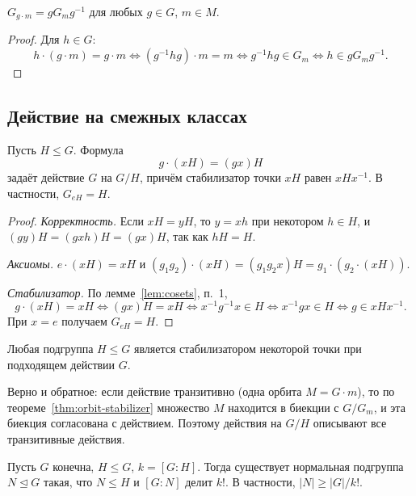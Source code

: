 \documentclass[12pt]{article}
\begin{document}
	\begin{statement}\label{st:conjugate-stabilizers}
		$G_{g \cdot m} = gG_mg^{-1}$ для любых $g \in G$, $m \in M$.
	\end{statement}

	\begin{proof}
		Для $h \in G$:
		\[
			h \cdot (g \cdot m) = g \cdot m \iff (g^{-1}hg) \cdot m = m \iff g^{-1}hg \in G_m \iff h \in gG_mg^{-1}.
		\]
	\end{proof}

	\subsection{Действие на смежных классах}

	\begin{theorem}\label{thm:action-on-cosets}
		Пусть $H \leqslant G$. Формула
		\[
			g \cdot (xH) = (gx)H
		\]
		задаёт действие $G$ на $G/H$, причём стабилизатор точки $xH$ равен $xHx^{-1}$. В частности, $G_{eH} = H$.
	\end{theorem}

	\begin{proof}
		\emph{Корректность.} Если $xH = yH$, то $y = xh$ при некотором $h \in H$, и $(gy)H = (gxh)H = (gx)H$, так как $hH = H$.

		\emph{Аксиомы.} $e \cdot (xH) = xH$ и $(g_1g_2) \cdot (xH) = (g_1g_2x)H = g_1 \cdot (g_2 \cdot (xH))$.

		\emph{Стабилизатор.} По лемме~\ref{lem:cosets}, п.~1,
		\[
			g \cdot (xH) = xH \iff (gx)H = xH \iff x^{-1}g^{-1}x \in H \iff x^{-1}gx \in H \iff g \in xHx^{-1}.
		\]
		При $x = e$ получаем $G_{eH} = H$.
	\end{proof}

	\begin{corollary}\label{cor:any-subgroup-stabilizer}
		Любая подгруппа $H \leqslant G$ является стабилизатором некоторой точки при подходящем действии $G$.
	\end{corollary}

	\begin{note}
		Верно и обратное: если действие транзитивно (одна орбита $M = G \cdot m$), то по теореме~\ref{thm:orbit-stabilizer} множество $M$ находится в биекции с $G/G_m$, и эта биекция согласована с действием. Поэтому действия на $G/H$ описывают все транзитивные действия.
	\end{note}

	\begin{theorem}\label{thm:core}
		Пусть $G$ конечна, $H \leqslant G$, $k = [G : H]$. Тогда существует нормальная подгруппа $N \trianglelefteq G$ такая, что $N \leqslant H$ и $[G : N]$ делит $k!$. В частности, $|N| \geqslant |G| / k!$.
	\end{theorem}
\end{document}
